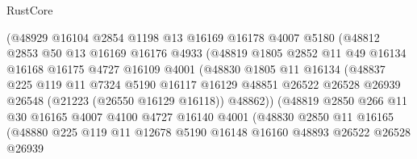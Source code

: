 \begin{lexlean}{RustCore}
\begin{coremodule}
                      (@48929
                        @16104
                        @2854
                        @1198
                        @13
                        @16169
                        @16178
                        @4007
                        @5180
                        (@48812
                          @2853
                          @50
                          @13
                          @16169
                          @16176
                          @4933
                          (@48819
                            @1805
                            @2852
                            @11
                            @49
                            @16134
                            @16168
                            @16175
                            @4727
                            @16109
                            @4001
                            (@48830
                              @1805
                              @11
                              @16134
                              (@48837
                                @225
                                @119
                                @11
                                @7324
                                @5190
                                @16117
                                @16129
                                @48851
                                @26522
                                @26528
                                @26939
                                @26548
                                (@21223 (@26550 @16129 @16118))
                                @48862))
                            (@48819
                              @2850
                              @266
                              @11
                              @30
                              @16165
                              @4007
                              @4100
                              @4727
                              @16140
                              @4001
                              (@48830
                                @2850
                                @11
                                @16165
                                (@48880
                                  @225
                                  @119
                                  @11
                                  @12678
                                  @5190
                                  @16148
                                  @16160
                                  @48893
                                  @26522
                                  @26528
                                  @26939

\end{coremodule}
\end{lexlean}
